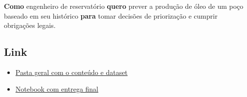 \documentclass[10pt, a4paper]{article}
\begin{document}
\textbf{Como} engenheiro de reservatório \textbf{quero} prever a produção de óleo de um poço baseado em seu histórico 
\textbf{para} tomar decisões de priorização e cumprir obrigações legais.

\subsection{Link}

\begin{itemize}
    \item \href{https://github.com/prj-phcp/ENGSOFTCD_Atividades/tree/master/Atividade02}{Pasta geral com o conteúdo e dataset}
    \item \href{https://github.com/prj-phcp/ENGSOFTCD_Atividades/blob/master/Atividade02/Atividade02.ipynb}{Notebook com entrega final}
\end{itemize}





\end{document}
